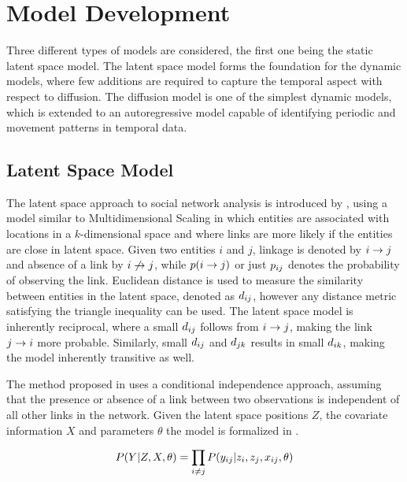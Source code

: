 \section{Model Development}

Three different types of models are considered, the first one being the static latent space model. The latent space model forms the foundation for the dynamic models, where few additions are required to capture the temporal aspect with respect to diffusion. The diffusion model is one of the simplest dynamic models, which is extended to an autoregressive model capable of identifying periodic and movement patterns in temporal data.

\subsection{Latent Space Model}

    The latent space approach to social network analysis is introduced by \citeauthor{hoff2002latent} \cite{hoff2002latent}, using a model similar to Multidimensional Scaling in which entities are associated with locations in a $k$-dimensional space and where links are more likely if the entities are close in latent space.
    Given two entities $i$ and $j$, linkage is denoted by $\link$ and absence of a link by $\link*$, while $p(\link)$ or just $\sub(p)$ denotes the probability of observing the link. 
    Euclidean distance is used to measure the similarity between entities in the latent space, denoted as $\sub(d)$, however any distance metric satisfying the triangle inequality can be used.
    The latent space model is inherently reciprocal, where a small $\sub(d)$ follows from $\link$, making the link $\link(j)(i)$ more probable. Similarly, small $\sub(d)$ and $\sub(d)(jk)$ results in small $\sub(d)(ik)$, making the model inherently transitive as well.
    
    The method proposed in \cite{hoff2002latent} uses a conditional independence approach, assuming that the presence or absence of a link between two observations is independent of all other links in the network. Given the latent space positions $Z$, the covariate information $X$ and parameters $\theta$ the model is formalized in . 
    
    \begin{equation}\label{eq:lsm-link-proba}
        P(Y|Z,X,\theta) = \prod_{i\neq j} P(\sub(y)|z_i,z_j,\sub(x),\theta)
    \end{equation}
    
